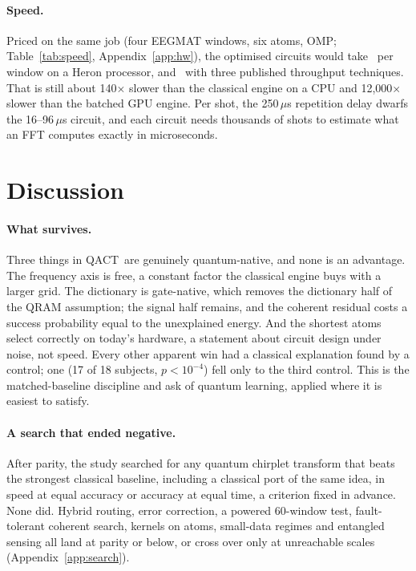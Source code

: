 \documentclass{article}
\newcommand{\qact}{QACT}
\begin{document}
\paragraph{Speed.} Priced on the same job (four EEGMAT windows, six atoms, OMP; Table~\ref{tab:speed}, Appendix~\ref{app:hw}), the optimised circuits would take \speedHeron\ per window on a Heron processor, and \speedAllThree\ with three published throughput techniques. That is still about 140$\times$ slower than the classical engine on a CPU and 12,000$\times$ slower than the batched GPU engine. Per shot, the 250\,$\mu$s repetition delay dwarfs the 16--96\,$\mu$s circuit, and each circuit needs thousands of shots to estimate what an FFT computes exactly in microseconds.


\section{Discussion}
\paragraph{What survives.} Three things in \qact\ are genuinely quantum-native, and none is an advantage. The frequency axis is free, a constant factor the classical engine buys with a larger grid. The dictionary is gate-native, which removes the dictionary half of the QRAM assumption; the signal half remains, and the coherent residual costs a success probability equal to the unexplained energy. And the shortest atoms select correctly on today's hardware, a statement about circuit design under noise, not speed. Every other apparent win had a classical explanation found by a control; one (17 of 18 subjects, $p<10^{-4}$) fell only to the third control. This is the matched-baseline discipline \citet{bowles2024better} and \citet{schuld2022quantum} ask of quantum learning, applied where it is easiest to satisfy.

\paragraph{A search that ended negative.} After parity, the study searched for any quantum chirplet transform that beats the strongest classical baseline, including a classical port of the same idea, in speed at equal accuracy or accuracy at equal time, a criterion fixed in advance. None did. Hybrid routing, error correction, a powered 60-window test, fault-tolerant coherent search, kernels on atoms, small-data regimes and entangled sensing all land at parity or below, or cross over only at unreachable scales (Appendix~\ref{app:search}).
\end{document}
